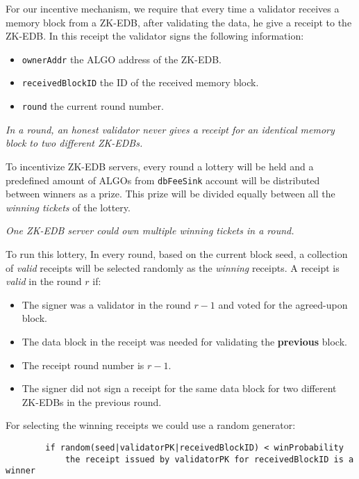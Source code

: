 \documentclass[11pt, A4]{report}
\begin{document}
    For our incentive mechanism, we require that every time a validator receives a memory block from a ZK-EDB, after
    validating the data, he give a receipt to the ZK-EDB. In this receipt the validator signs the following information:

    \begin{itemize}
        \item \texttt{ownerAddr} the ALGO address of the ZK-EDB\@.
        \item \texttt{receivedBlockID} the ID of the received memory block.
        \item \texttt{round} the current round number.
    \end{itemize}

    \emph{In a round, an honest validator never gives a receipt for an identical memory block to two different ZK-EDBs.}

    To incentivize ZK-EDB servers, every round a lottery will be held and a predefined amount of ALGOs from
    \texttt{dbFeeSink} account will be distributed between winners as a prize. This prize will be divided equally
    between all the \emph{winning tickets} of the lottery.

    \emph{One ZK-EDB server could own multiple winning tickets in a round.}

    To run this lottery, In every round, based on the current block seed, a collection of \emph{valid} receipts will be
    selected randomly as the \emph{winning} receipts. A receipt is \emph{valid} in the round \(r\) if:

    \begin{itemize}
        \item The signer was a validator in the round \(r - 1\) and voted for the agreed-upon block.
        \item The data block in the receipt was needed for validating the \textbf{previous} block.
        \item The receipt round number is \(r - 1\).
        \item The signer did not sign a receipt for the same data block for two different ZK-EDBs in the previous round.
    \end{itemize}

    For selecting the winning receipts we could use a random generator:

    \begin{verbatim}
        if random(seed|validatorPK|receivedBlockID) < winProbability
            the receipt issued by validatorPK for receivedBlockID is a winner
    \end{verbatim}
\end{document}
